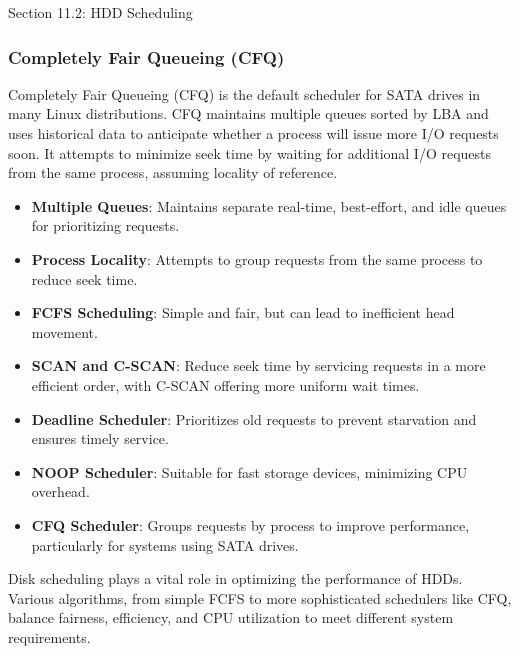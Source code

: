 \begin{notes}{Section 11.2: HDD Scheduling}
\begin{highlight}
    \end{highlight}
    
    \subsubsection*{Completely Fair Queueing (CFQ)}
    
    Completely Fair Queueing (CFQ) is the default scheduler for SATA drives in many Linux distributions. CFQ maintains multiple queues sorted by LBA and uses historical data to anticipate whether a 
    process will issue more I/O requests soon. It attempts to minimize seek time by waiting for additional I/O requests from the same process, assuming locality of reference.
    
    \begin{highlight}
    
        \begin{itemize}
            \item \textbf{Multiple Queues}: Maintains separate real-time, best-effort, and idle queues for prioritizing requests.
            \item \textbf{Process Locality}: Attempts to group requests from the same process to reduce seek time.
        \end{itemize}
    
    \end{highlight}
    
    \begin{highlight}
    
        \begin{itemize}
            \item \textbf{FCFS Scheduling}: Simple and fair, but can lead to inefficient head movement.
            \item \textbf{SCAN and C-SCAN}: Reduce seek time by servicing requests in a more efficient order, with C-SCAN offering more uniform wait times.
            \item \textbf{Deadline Scheduler}: Prioritizes old requests to prevent starvation and ensures timely service.
            \item \textbf{NOOP Scheduler}: Suitable for fast storage devices, minimizing CPU overhead.
            \item \textbf{CFQ Scheduler}: Groups requests by process to improve performance, particularly for systems using SATA drives.
        \end{itemize}
    
    Disk scheduling plays a vital role in optimizing the performance of HDDs. Various algorithms, from simple FCFS to more sophisticated schedulers like CFQ, balance fairness, efficiency, and CPU 
    utilization to meet different system requirements.
    
    \end{highlight}

\end{notes}

